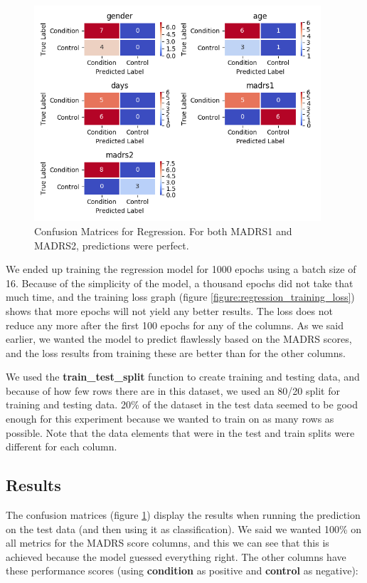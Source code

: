 \begin{figure}
      \includegraphics[height=8cm]{img/regression/confusion_kerasregressor_grouped.png}
      \caption{Confusion Matrices for Regression. For both MADRS1 and MADRS2, predictions were perfect.}
      \label{figure:regression_test_confusion}
\end{figure}

We ended up training the regression model for 1000 epochs using a batch size of 16. Because of the simplicity of the model, a thousand epochs did not take that much time, and the training loss graph (figure \ref{figure:regression_training_loss}) shows that more epochs will not yield any better results. The loss does not reduce any more after the first 100 epochs for any of the columns. As we said earlier, we wanted the model to predict flawlessly based on the MADRS scores, and the loss results from training these are better than for the other columns. 

We used the \textbf{train\_test\_split} function to create training and testing data, and because of how few rows there are in this dataset, 
we used an 80/20 split for training and testing data. 20\% of the dataset in the test data seemed to be good enough for this experiment because we wanted to train on as many rows as possible. Note that the data elements that were in the test and train splits were different for each column. 

\subsection{Results}

The confusion matrices (figure \ref{figure:regression_test_confusion}) display the results when running the prediction on the test data (and then using it as classification). We said we wanted 100\% on all metrics for the MADRS score columns, and this we can see that this is achieved because the model guessed everything right. The other columns have these performance scores (using \textbf{condition} as positive and \textbf{control} as negative):

